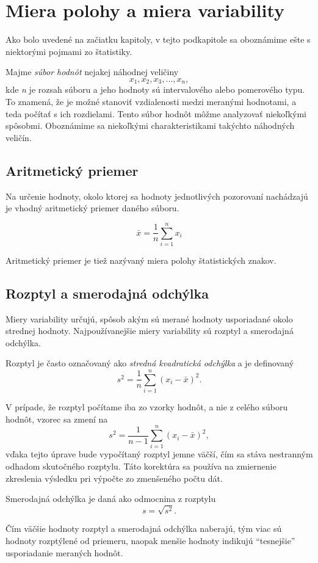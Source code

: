 \section{Miera polohy a miera variability}
Ako bolo uvedené na začiatku kapitoly, v tejto podkapitole sa oboznámime ešte s niektorými pojmami zo štatistiky.

Majme \textit{súbor hodnôt} nejakej náhodnej veličiny
 \begin{equation}
x_1,x_2,x_3,...,x_n,
\end{equation}  
kde \textit{n} je rozsah súboru a jeho hodnoty sú intervalového alebo pomerového typu. To znamená, že je možné  stanoviť vzdialenosti medzi meranými hodnotami, a teda počítať s ich rozdielami. Tento súbor hodnôt môžme analyzovať niekoľkými spôsobmi. Oboznámime sa niekoľkými charakteristikami takýchto náhodných veličín.

\subsection{Aritmetický priemer}
Na určenie hodnoty, okolo ktorej sa hodnoty jednotlivých pozorovaní nachádzajú je vhodný aritmetický priemer daného súboru. 

\begin{equation}
\bar{x} = \frac{1}{n} \sum\limits_{i=1}^{n} x_i
\end{equation}

Aritmetický priemer je tiež nazývaný miera polohy štatistických znakov.

\subsection{Rozptyl a smerodajná odchýlka}

Miery variability určujú, spôsob akým sú merané hodnoty usporiadané okolo strednej hodnoty. Najpoužívanejšie miery variability sú rozptyl a smerodajná odchýlka.

Rozptyl je  často označovaný ako \textit{stredná kvadratická odchýlka} a je definovaný
\begin{equation}
s^2 = \frac{1}{n}\sum\limits_{i=1}^{n}(x_i - \bar{x})^2.
\end{equation}

V prípade, že rozptyl počítame iba zo vzorky hodnôt, a nie z celého súboru hodnôt, vzorec sa zmení na
 \begin{equation}
s^2 = \frac{1}{n-1}\sum\limits_{i=1}^{n}(x_i - \bar{x})^2,
\end{equation}
vďaka tejto úprave bude vypočítaný rozptyl jemne väčší, čím sa stáva nestranným odhadom skutočného rozptylu. Táto korektúra sa používa na zmiernenie zkreslenia výsledku pri výpočte zo zmenšeného počtu dát.

Smerodajná odchýlka je daná ako odmocnina z rozptylu
\begin{equation}
s = \sqrt{s^2}.
\end{equation}

Čím väčšie hodnoty rozptyl a smerodajná odchýlka naberajú, tým viac sú hodnoty rozptýlené od priemeru, naopak menšie hodnoty indikujú ``tesnejšie'' usporiadanie meraných hodnôt.


